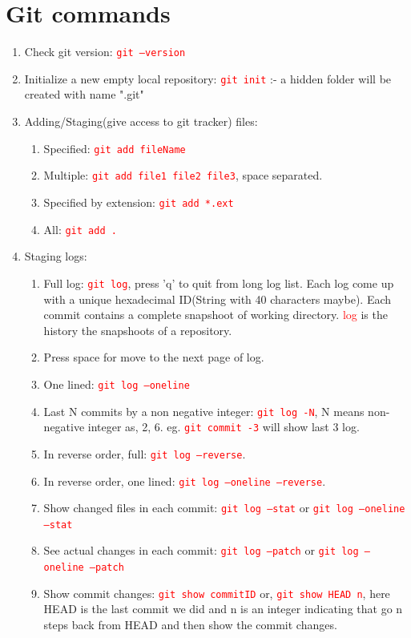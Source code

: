 \documentclass[12 pt, letterpaper]{extarticle}
\newcommand{\R}{\textcolor{red}} %
\newcommand{\T}{\texttt}
\begin{document}
\section*{Git commands}

\begin{enumerate}
	\item Check git version: \R{\T{git --version}}
	\item Initialize a new empty local repository: \R{\T{git init}} :- a hidden folder will be created with name ".git"

	\item Adding/Staging(give access to git tracker) files:
		\begin{enumerate}
			\item Specified: \R{\T{git add fileName}}
			\item Multiple: \R{\T{git add file1 file2 file3}}, space separated.
			\item Specified by extension: \R{\T{git add *.ext}}
			\item All: \R{\T{git add .}}
		\end{enumerate}
	\item Staging logs:
		\begin{enumerate}
			\item Full log: \R{\T{git log}}, press 'q' to quit from long log list. Each log come up with a unique hexadecimal ID(String with 40 characters maybe). Each commit contains a complete snapshoot of working directory. \R{log} is the history the snapshoots of a repository.
			\item Press space for move to the next page of log.
			\item One lined: \R{\T{git log --oneline}}
			\item Last N commits by a non negative integer: \R{\T{git log -N}}, N means non-negative integer as, 2, 6. eg. \R{\T{git commit -3}} will show last 3 log.
			\item In reverse order, full: \R{\T{git log --reverse}}.
			\item In reverse order, one lined: \R{\T{git log --oneline --reverse}}.
			\item Show changed files in each commit: \R{\T{git log --stat}} or \R{\T{git log --oneline --stat}}
			\item See actual changes in each commit: \R{\T{git log --patch}} or \R{\T{git log --oneline --patch}}
			\item Show commit changes: \R{\T{git show commitID}} or, \R{\T{git show HEAD~n}}, here HEAD is the last commit we did and n is an integer indicating that go n steps back from HEAD and then show the commit changes.

\end{enumerate}
\end{enumerate}
\end{document}

